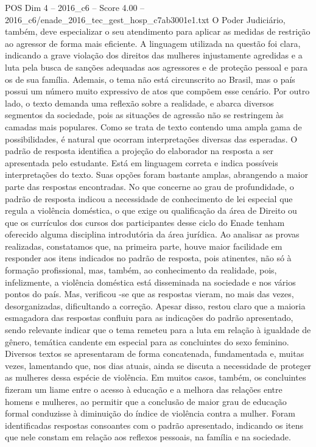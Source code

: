 \begin{textsample}{POS Dim 4 – 2016\_c6 – Score 4.00 – 2016\_c6/enade\_2016\_tec\_gest\_hosp\_c7ab3001e1.txt}
O Poder Judiciário, também, deve especializar o seu atendimento para aplicar as medidas de restrição ao agressor de forma mais eficiente.
A linguagem utilizada na questão foi clara, indicando a grave violação dos direitos das mulheres injustamente agredidas e a luta pela busca de sanções adequadas aos agressores e de proteção pessoal e para os de sua família.
Ademais, o tema não está circunscrito ao Brasil, mas o país possui um número muito expressivo de atos que compõem esse cenário.
Por outro lado, o texto demanda uma reflexão sobre a realidade, e abarca diversos segmentos da sociedade, pois as situações de agressão não se restringem às camadas mais populares.
Como se trata de texto contendo uma ampla gama de possibilidades, é natural que ocorram interpretações diversas das esperadas.
O padrão de resposta identifica a projeção do elaborador na resposta a ser apresentada pelo estudante.
Está em linguagem correta e indica possíveis interpretações do texto.
Suas opções foram bastante amplas, abrangendo a maior parte das respostas encontradas.
No que concerne ao grau de profundidade, o padrão de resposta indicou a necessidade de conhecimento de lei especial que regula a violência doméstica, o que exige ou qualificação da área de Direito ou que os currículos dos cursos dos participantes desse ciclo do Enade tenham oferecido alguma disciplina introdutória da área jurídica.
Ao analisar as provas realizadas, constatamos que, na primeira parte, houve maior facilidade em responder aos itens indicados no padrão de resposta, pois atinentes, não só à formação profissional, mas, também, ao conhecimento da realidade, pois, infelizmente, a violência doméstica está disseminada na sociedade e nos vários pontos do país.
Mas, verificou -se que as respostas vieram, no mais das vezes, desorganizadas, dificultando a correção.
Apesar disso, restou claro que a maioria esmagadora das respostas confluiu para as indicações do padrão apresentado, sendo relevante indicar que o tema remeteu para a luta em relação à igualdade de gênero, temática candente em especial para as concluintes do sexo feminino.
Diversos textos se apresentaram de forma concatenada, fundamentada e, muitas vezes, lamentando que, nos dias atuais, ainda se discuta a necessidade de proteger as mulheres dessa espécie de violência.
Em muitos casos, também, os concluintes fizeram um liame entre o acesso à educação e a melhora das relações entre homens e mulheres, ao permitir que a conclusão de maior grau de educação formal conduzisse à diminuição do índice de violência contra a mulher.
Foram identificadas respostas consoantes com o padrão apresentado, indicando os itens que nele constam em relação aos reflexos pessoais, na família e na sociedade.

\end{textsample}
